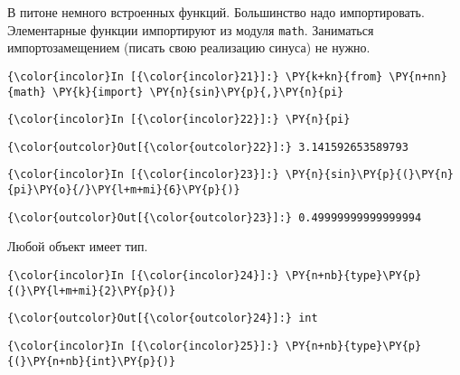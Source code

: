В питоне немного встроенных функций. Большинство надо импортировать.
Элементарные функции импортируют из модуля \texttt{math}. Заниматься
импортозамещением (писать свою реализацию синуса) не нужно.

    \begin{Verbatim}[commandchars=\\\{\}]
{\color{incolor}In [{\color{incolor}21}]:} \PY{k+kn}{from} \PY{n+nn}{math} \PY{k}{import} \PY{n}{sin}\PY{p}{,}\PY{n}{pi}
\end{Verbatim}

    \begin{Verbatim}[commandchars=\\\{\}]
{\color{incolor}In [{\color{incolor}22}]:} \PY{n}{pi}
\end{Verbatim}

            \begin{Verbatim}[commandchars=\\\{\}]
{\color{outcolor}Out[{\color{outcolor}22}]:} 3.141592653589793
\end{Verbatim}
        
    \begin{Verbatim}[commandchars=\\\{\}]
{\color{incolor}In [{\color{incolor}23}]:} \PY{n}{sin}\PY{p}{(}\PY{n}{pi}\PY{o}{/}\PY{l+m+mi}{6}\PY{p}{)}
\end{Verbatim}

            \begin{Verbatim}[commandchars=\\\{\}]
{\color{outcolor}Out[{\color{outcolor}23}]:} 0.49999999999999994
\end{Verbatim}
        
    Любой объект имеет тип.

    \begin{Verbatim}[commandchars=\\\{\}]
{\color{incolor}In [{\color{incolor}24}]:} \PY{n+nb}{type}\PY{p}{(}\PY{l+m+mi}{2}\PY{p}{)}
\end{Verbatim}

            \begin{Verbatim}[commandchars=\\\{\}]
{\color{outcolor}Out[{\color{outcolor}24}]:} int
\end{Verbatim}
        
    \begin{Verbatim}[commandchars=\\\{\}]
{\color{incolor}In [{\color{incolor}25}]:} \PY{n+nb}{type}\PY{p}{(}\PY{n+nb}{int}\PY{p}{)}
\end{Verbatim}

